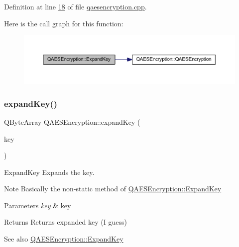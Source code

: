 Definition at line \mbox{\hyperlink{qaesencryption_8cpp_source_l00018}{18}} of file \mbox{\hyperlink{qaesencryption_8cpp_source}{qaesencryption.\+cpp}}.

Here is the call graph for this function\+:
\nopagebreak
\begin{figure}[H]
\begin{center}
\leavevmode
\includegraphics[width=350pt]{class_q_a_e_s_encryption_a2112456e057e6dd886694348fbf202cd_cgraph}
\end{center}
\end{figure}
\mbox{\label{class_q_a_e_s_encryption_a5bfbb972f84a8376fceed648553c0912}} 
\subsubsection{\texorpdfstring{expand\+Key()}{expandKey()}}
{\footnotesize\ttfamily Q\+Byte\+Array Q\+A\+E\+S\+Encryption\+::expand\+Key (\begin{DoxyParamCaption}\item[{const Q\+Byte\+Array \&}]{key }\end{DoxyParamCaption})}



Expand\+Key Expands the key. 

\begin{DoxyNote}{Note}
Basically the non-\/static method of \mbox{\hyperlink{class_q_a_e_s_encryption_a2112456e057e6dd886694348fbf202cd}{Q\+A\+E\+S\+Encryption\+::\+Expand\+Key}}
\end{DoxyNote}

\begin{DoxyParams}{Parameters}
{\em key} & key \\
\hline
\end{DoxyParams}
\begin{DoxyReturn}{Returns}
Returns expanded key (I guess) 
\end{DoxyReturn}
\begin{DoxySeeAlso}{See also}
\mbox{\hyperlink{class_q_a_e_s_encryption_a2112456e057e6dd886694348fbf202cd}{Q\+A\+E\+S\+Encryption\+::\+Expand\+Key}} 
\end{DoxySeeAlso}


